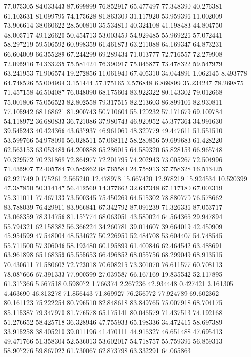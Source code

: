 77.075305
84.033443
87.699899
76.852917
65.477497
77.348390
40.276381
61.103631
81.099795
74.175628
81.863309
31.117920
53.959396
11.002009
73.906614
38.060622
28.500810
35.534810
40.324108
41.198483
44.804750
48.005717
49.126620
50.454713
53.003459
54.929485
55.969226
57.072441
58.297219
59.506592
60.998359
61.461873
63.211088
64.169347
64.873231
66.604009
66.355289
67.244299
69.289434
71.013777
72.716557
72.279908
72.095916
74.333235
75.581424
76.390917
75.046877
73.478322
59.547979
63.241953
71.906574
19.272856
11.061940
67.405310
34.044891
1.062145
8.493778
64.748526
55.004994
3.151444
57.175165
3.576848
6.868899
35.234247
78.269875
71.457158
46.504087
76.048090
68.175604
83.922322
80.143302
79.012668
75.001806
75.056523
82.802558
79.317515
82.213603
86.899106
82.930811
77.105942
68.168621
81.900743
50.710604
55.120232
57.171679
69.109784
54.118972
36.680833
36.721086
37.980743
46.920952
45.377364
34.991630
39.545243
40.424366
43.637937
46.961060
48.320779
49.447611
51.551510
53.599766
54.978090
56.028511
57.068112
58.280856
59.699683
61.428220
62.563153
63.053489
64.200888
65.286015
64.589320
65.828153
66.965748
70.329572
70.231868
72.864977
72.201795
74.202943
73.005267
72.504996
71.435907
72.405784
70.589862
68.765584
24.758913
37.758328
16.513425
62.921749
0.175261
2.565240
12.478978
15.667420
12.978219
15.924534
10.520399
47.387850
50.314147
56.412569
14.377662
32.647348
67.117180
67.003319
75.311011
77.467133
73.500345
75.450269
64.515302
78.880770
76.578662
83.788039
76.429911
83.966841
67.342792
87.091239
71.326336
87.053717
73.068359
78.314756
81.157774
68.063051
43.580024
64.564366
29.947894
55.794321
62.158382
56.366224
34.260781
39.014607
39.664019
42.450909
45.954599
47.548004
48.534627
50.226950
52.484708
53.604407
54.748545
55.711500
57.306046
58.193480
60.195899
61.400846
62.464542
63.488691
63.961898
65.168359
65.555653
66.496852
68.055756
68.299049
68.913515
70.430611
71.580602
72.723018
70.608216
73.301070
76.611577
60.708113
78.087666
67.391333
77.900599
27.039587
66.167169
19.835542
52.117895
61.317366
5.567518
0.598072
1.766374
2.267236
42.934448
0.427421
3.161305
4.463690
46.813278
71.856443
71.869927
76.256972
77.924789
69.602362
80.161123
75.222254
80.796510
82.848618
83.849765
75.007918
68.704175
85.115387
79.347970
81.776578
65.175141
80.046579
71.437513
74.192168
51.276652
58.425718
36.328946
47.755933
65.198336
34.472415
58.697389
33.915258
38.405210
39.011196
41.470111
44.916327
46.651488
47.695413
49.471766
51.358304
52.536013
53.602017
54.718757
55.759396
56.859313
58.907276
59.867022
61.730067
62.873798
63.332291
64.065863
